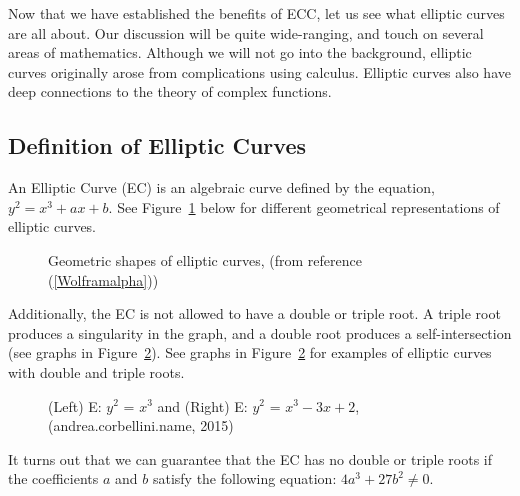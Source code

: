 Now that we have established the benefits of ECC, let us see what elliptic curves are all about. Our discussion will be quite wide-ranging, and touch on several areas of mathematics. Although we will not go into the background, elliptic curves originally arose from complications using calculus. Elliptic curves also have deep connections to the theory of complex functions. 

\subsection{Definition of Elliptic Curves}
An Elliptic Curve (EC) is an algebraic curve defined by the equation, $y^2 = x^3 + ax + b$.  See Figure~\ref{fig:DH:DHKE_5} below for different geometrical representations of elliptic  curves.  
\begin{figure}[H]
	  \caption{\label{fig:DH:DHKE_5}  Geometric shapes of elliptic curves, (from reference (\ref{Wolframalpha}))}
\end{figure}
Additionally, the EC is not allowed to have a double or triple root.  A triple root produces a singularity in the graph, and a double root produces a self-intersection (see graphs in Figure~\ref{fig:DH:DHKE_10}). See graphs in Figure~\ref{fig:DH:DHKE_10} for examples of elliptic curves with double and triple roots.
\begin{figure}[H]
	  \caption{\label{fig:DH:DHKE_10}(Left) E: $ y^2$ = $x^3$ and (Right) E: $ y^2$ = $x^3-3x+2$, (andrea.corbellini.name, 2015)}
\end{figure}
 It turns out that we can guarantee that the EC has no double or triple roots if the coefficients $a$ and $b$ satisfy the following equation: $4a^3 + 27b^2 \neq 0$. 

